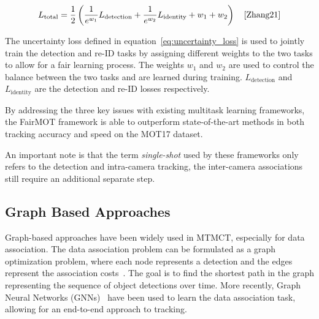 \begin{equation}
    \label{eq:uncertainty_loss}
    L_{\text{total}}=\frac{1}{2}\left(\frac{1}{e^{w_1}} L_{\text{detection}}+\frac{1}{e^{w_2}} L_{\text{identity}}+w_1+w_2\right)
    \quad\text{\cite[Eq.~5]{Zhang21}}
\end{equation}

The uncertainty loss defined in equation~\ref{eq:uncertainty_loss} is used to jointly train the detection and re-ID tasks by assigning different weights to the two tasks to allow for a fair learning process. The weights \(w_1\) and \(w_2\) are used to control the balance between the two tasks and are learned during training. \(L_{\text{detection}}\) and \(L_{\text{identity}}\) are the detection and re-ID losses respectively.

By addressing the three key issues with existing multitask learning frameworks, the FairMOT framework is able to outperform state-of-the-art methods in both tracking accuracy and speed on the MOT17 dataset.

An important note is that the term \textit{single-shot} used by these frameworks only refers to the detection and intra-camera tracking, the inter-camera associations still require an additional separate step.

\subsection{Graph Based Approaches}\label{subsec:graph_based_approaches}
Graph-based approaches have been widely used in MTMCT, especially for data association. The data association problem can be formulated as a graph optimization problem, where each node represents a detection and the edges represent the association costs~\cite{Zhang08}. The goal is to find the shortest path in the graph representing the sequence of object detections over time. More recently, Graph Neural Networks (GNNs)~\cite{Scarselli09} have been used to learn the data association task, allowing for an end-to-end approach to tracking.

